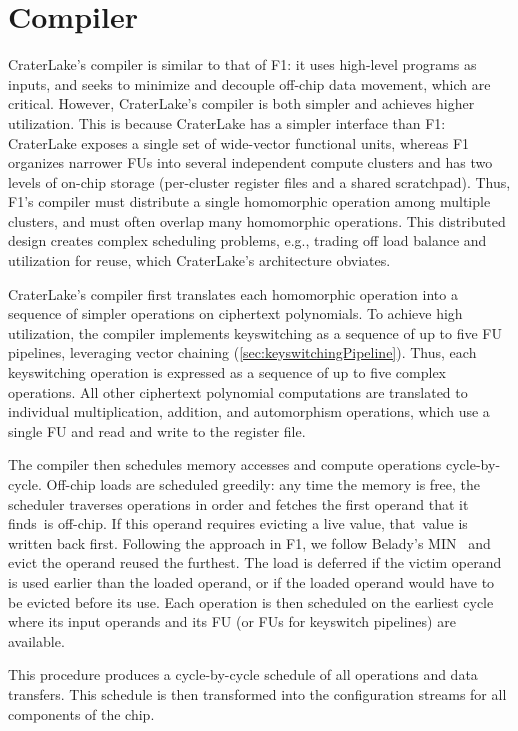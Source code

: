 \section{Compiler}\label{sec:algorithmicInsights}
\label{sec:compiler}

CraterLake's compiler is similar to that of F1: it uses high-level programs as
inputs, and seeks to minimize and decouple off-chip data movement, which are
critical. However, CraterLake's compiler is both simpler and achieves higher
utilization. This is because CraterLake has a simpler interface than F1:
CraterLake exposes a single set of wide-vector functional units, whereas F1
organizes narrower FUs into several independent compute clusters and has two
levels of on-chip storage (per-cluster register files and a shared scratchpad).
Thus, F1's compiler must distribute a single homomorphic operation among
multiple clusters, and must often overlap many homomorphic operations. This
distributed design creates complex scheduling problems, e.g., trading off load
balance and utilization for reuse, which CraterLake's architecture obviates.

CraterLake's compiler first translates each homomorphic operation into a
sequence of simpler operations on ciphertext polynomials. To achieve high
utilization, the compiler implements keyswitching as a sequence of up to five
FU pipelines, leveraging vector chaining (\autoref{sec:keyswitchingPipeline}).
Thus, each keyswitching operation is expressed as a sequence of up to five
complex operations. All other ciphertext polynomial computations are translated
to individual multiplication, addition, and automorphism operations, which use
a single FU and read and write to the register file.

The compiler then schedules memory accesses and compute operations
cycle-by-cycle. Off-chip loads are scheduled greedily: any time the memory is
free, the scheduler traverses operations in order and fetches the first operand
that it finds~is off-chip. If this operand requires evicting a live value,
that~value is written back first. Following the approach in F1, we follow
Belady's MIN~\cite{belady1966study} and evict the operand reused the furthest.
The load is deferred if the victim operand is used earlier than the loaded
operand, or if the loaded operand would have to be evicted before its use. Each
operation is then scheduled on the earliest cycle where its input operands and
its FU (or FUs for keyswitch pipelines) are available.

This procedure produces a cycle-by-cycle schedule of all operations and data
transfers. This schedule is then transformed into the configuration streams for
all components of the chip.

